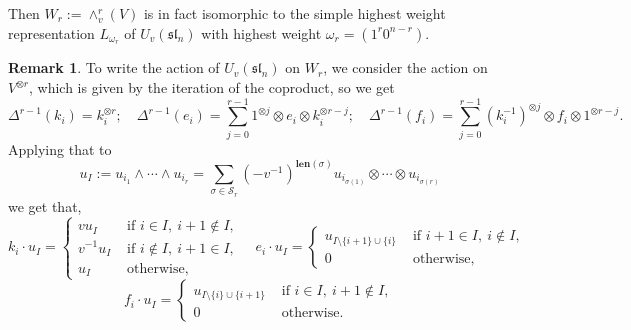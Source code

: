 \documentclass{amsart}
\numberwithin{equation}{section}
\theoremstyle{theorem}
\theoremstyle{definition}
\newtheorem{remark}[theorem]{Remark}
\newcommand{\sll}{\mathfrak{sl}}
\newcommand{\len}{\mathbf{len}}
\newcommand{\uvsln}{U_v(\sll_n)}
\begin{document}
Then $W_r:= \wedge_v^r(V)$ is in fact isomorphic to the simple highest weight representation $L_{\omega_r}$ of $\uvsln$ with highest weight $\omega_r=(1^r0^{n-r})$.

\begin{remark}
To write the action of $\uvsln$ on $W_r$, we consider the action on $V^{\otimes r}$, which is given by the iteration of the coproduct, so we get
\[\Delta^{r-1}(k_i)=k_i^{\otimes r};\quad \Delta^{r-1}(e_i)=\sum_{j=0}^{r-1} 1^{\otimes j}\otimes e_i\otimes k_i^{\otimes r-j};\quad \Delta^{r-1}(f_i)=\sum_{j=0}^{r-1} (k_i^{-1})^{\otimes j}\otimes f_i\otimes 1^{\otimes r-j}.\]
Applying that to \[u_I:=u_{i_1}\wedge\cdots\wedge u_{i_r}=\sum_{\sigma\in \mathcal S_r}(-v^{-1})^{\len(\sigma)}u_{i_{\sigma(1)}}\otimes\cdots\otimes u_{i_{\sigma(r)}}\] we get that,
\[ k_i\cdot u_I=\begin{cases}v u_I & \text{ if }i\in I,~ i+1\not\in I,\\
v^{-1} u_I & \text{ if }i\not\in I,~ i+1\in I,\\
u_I & \text{ otherwise,}\end{cases}\quad e_i\cdot u_I=\begin{cases}u_{I\setminus\{i+1\}\cup\{i\}} & \text{ if }i+1\in I,~ i\not\in I,\\
0 & \text{ otherwise,}\end{cases}\]
\[ f_i\cdot u_I=\begin{cases}u_{I\setminus\{i\}\cup\{i+1\}} & \text{ if }i\in I,~ i+1\not\in I,\\
0 & \text{ otherwise.}\end{cases}\]
\end{remark}
\end{document}
